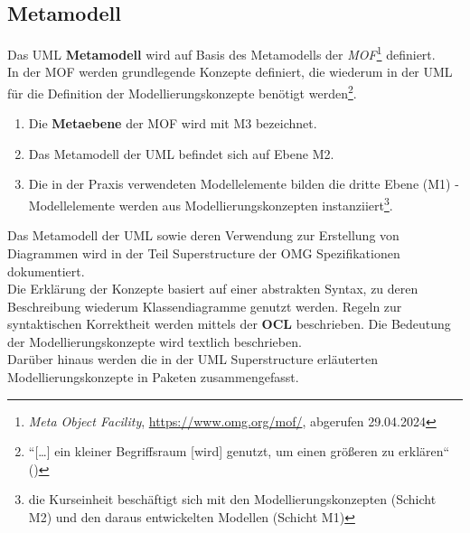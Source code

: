 \subsection*{Metamodell}
Das UML \textbf{Metamodell} wird auf Basis des Metamodells der \textit{MOF}\footnote{
\textit{Meta Object Facility}, \url{https://www.omg.org/mof/}, abgerufen 29.04.2024
} definiert.\\
In der MOF werden grundlegende Konzepte definiert, die wiederum in der UML für die Definition der Modellierungskonzepte benötigt werden\footnote{
``[\ldots] ein kleiner Begriffsraum [wird] genutzt, um einen größeren zu erklären`` (\cite[5]{Buh09})
}.

\begin{enumerate}
    \item Die \textbf{Metaebene} der MOF wird mit M3 bezeichnet.
    \item Das Metamodell der UML befindet sich auf Ebene M2.
    \item Die in der Praxis verwendeten Modellelemente bilden die dritte Ebene (M1) - Modellelemente werden aus Modellierungskonzepten instanziiert\footnote{
    die Kurseinheit beschäftigt sich mit den Modellierungskonzepten (Schicht M2) und den daraus entwickelten Modellen (Schicht M1)
    }.
\end{enumerate}

\noindent
Das Metamodell der UML sowie deren Verwendung zur Erstellung von Diagrammen wird in der Teil Superstructure der OMG Spezifikationen dokumentiert.\\
Die Erklärung der Konzepte basiert auf einer abstrakten Syntax, zu deren Beschreibung wiederum Klassendiagramme genutzt werden.
Regeln zur syntaktischen Korrektheit werden mittels der \textbf{OCL} beschrieben.
Die Bedeutung der Modellierungskonzepte wird textlich beschrieben.\\
Darüber hinaus werden die in der UML Superstructure erläuterten Modellierungskonzepte in Paketen zusammengefasst.
